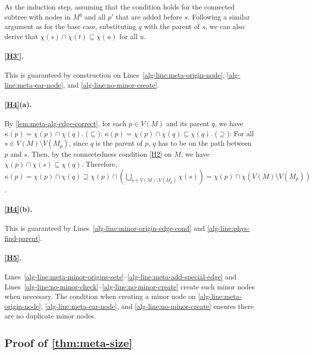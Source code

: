 As the induction step, assuming that the condition holds for the connected subtree with nodes in $M^q$ and all $p'$ that are added before $s$. Following a similar argument as for the base case, substituting $q$ with the parent of $s$, we can also derive that $\chi(s) \cap \chi(t) \subseteq \chi(u)$ for all $u$.

\paragraph{\ref{H3'}.} This is guaranteed by construction on Lines~\ref{alg-line:meta-origin-node}, \ref{alg-line:meta-ear-node}, and \ref{alg-line:no-minor-create}.

\paragraph{\ref{H4}(a).}
By \cref{lem:meta-alg-edge-correct}, for each $p \in V(M)$ and its parent $q$, we have $\kappa(p) = \chi(p) \cap \chi(q)$.
($\subseteq$): $\kappa(p) = \chi(p) \cap \chi(q) \subseteq \chi(q)$.
($\supseteq$): For all $s \in V(M) \setminus V(M_p)$, since $q$ is the parent of $p$, $q$ has to be on the path between $p$ and $s$. Then, by the connectedness condition \ref{H2} on $M$, we have $\chi(p) \cap \chi(s) \subseteq \chi(q)$. Therefore, $\kappa(p) = \chi(p) \cap \chi(q) \supseteq \chi(p) \cap \left( \bigcup_{s \in V(M) \setminus V(M_p)} \chi(s) \right) = \chi(p) \cap \chi(V(M) \setminus V(M_p))$.

\paragraph{\ref{H4}(b).} This is guaranteed by Lines~\ref{alg-line:minor-origin-edge-cond} and \ref{alg-line:phys-find-parent}.

\paragraph{\ref{H5}.} Lines~\ref{alg-line:meta-minor-origins-sets}--\ref{alg-line:meta-add-special-edge} and Lines~\ref{alg-line:no-minor-check}--\ref{alg-line:no-minor-create} create such minor nodes when necessary. 
The condition when creating a minor node on \cref{alg-line:meta-origin-node}, \cref{alg-line:meta-ear-node}, and \cref{alg-line:no-minor-create} ensures there are no duplicate minor nodes.

\subsection{Proof of \cref{thm:meta-size}}

